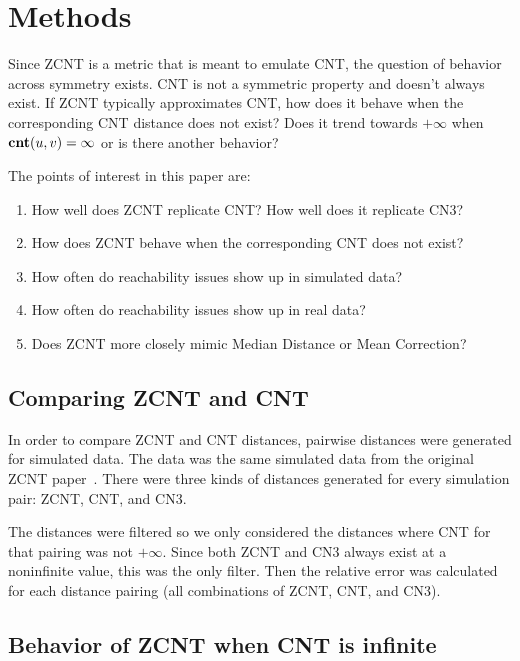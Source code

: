 \section{Methods}
Since ZCNT is a metric that is meant to emulate CNT, the question of behavior across symmetry exists. CNT is not a symmetric property and doesn't always exist. If ZCNT typically approximates CNT, how does it behave when the corresponding CNT distance does not exist? Does it trend towards $+\infty$ when $\textbf{cnt}(u, v) = \infty$ or is there another behavior?

\vspace{10pt}

\noindent The points of interest in this paper are: 

\begin{enumerate}\label{enumerate:questions}
    \item How well does ZCNT replicate CNT\@? How well does it replicate CN3?
    \item How does ZCNT behave when the corresponding CNT does not exist?
    \item How often do reachability issues show up in simulated data? 
    \item How often do reachability issues show up in real data? 
    \item Does ZCNT more closely mimic Median Distance or Mean Correction?
\end{enumerate}

\subsection{Comparing ZCNT and CNT}\label{section:comp_dist}

In order to compare ZCNT and CNT distances, pairwise distances were generated for simulated data. The data was the same simulated data from the original ZCNT paper~\cite{zcnt_paper}. There were three kinds of distances generated for every simulation pair: ZCNT, CNT, and CN3. 

The distances were filtered so we only considered the distances where CNT for that pairing was not $+\infty$. Since both ZCNT and CN3 always exist at a noninfinite value, this was the only filter. Then the relative error was calculated for each distance pairing (all combinations of ZCNT, CNT, and CN3). 

\subsection{Behavior of ZCNT when CNT is infinite}\label{section:behavior}

